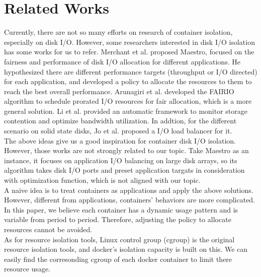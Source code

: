 \documentclass[10pt, conference,compsoc]{IEEEtran}
\begin{document}
\section{Related Works}
Currently, there are not so many efforts on research of container isolation, especially on disk I/O. However, some researchers interested in disk I/O isolation has some works for us to refer. Merchant et al. \cite{Merchant2011MaestroQI} proposed Maestro, focused on the fairness and performance of disk I/O allocation for different applications. He hypothesized there are different performance targets (throughput or I/O directed) for each application, and developed a policy to allocate the resources to them to reach the best overall performance. Arunagiri et al.\cite{Arunagiri2011FAIRIOAA} developed the FAIRIO algorithm to schedule prorated I/O resources for fair allocation, which is a more general solution. Li et al.\cite{Li2015ASCARAC} provided an automatic framework to monitor storage contention and optimize bandwidth utilization. In addtion, for the different scenario on solid state disks, Jo et al.\cite{Jo2017DynamicLB} proposed a I/O load balancer for it. \\

The above ideas give us a good inspiration for container disk I/O isolation. However, those works are not strongly related to our topic. Take Maestro as an instance, it focuses on application I/O balancing on large disk arrays, so its algorithm takes disk I/O ports and preset application targats in consideration with optimization function, which is not aligned with our topic.\\

A naive idea is to treat containers as applications and apply the above solutions. However, different from applications, containers' behaviors are more complicated. In this paper, we believe each container has a dynamic usage pattern and is variable from period to period. Therefore, adjusting the policy to allocate resources cannot be avoided.\\

As for resource isolation tools, Linux control group (cgroup) is the original resource isolation tools, and docker's isolation capacity is built on this. We can easily find the corresonding cgroup of each docker container to limit there resource usage.\\
\end{document}
